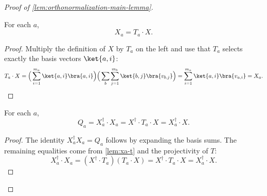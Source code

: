 \begin{proof}[Proof of \ref{lem:orthonormalization-main-lemma}]
	\begin{lemma}\label{lem:xa-t}
		\leanok
		For each $a$,
		\[
			X_a = T_a \cdot X.
		\]
	\end{lemma}
	\begin{proof}
		\leanok
		Multiply the definition of $X$ by $T_a$ on the left and use that $T_a$ selects exactly the basis vectors $\ket{a,i}$:
		\[
			T_a \cdot X
			=
			\Big(\sum_{i=1}^{m_a} \ket{a,i}\bra{a,i}\Big)
			\Big(\sum_b \sum_{j=1}^{m_b} \ket{b,j}\bra{v_{b,j}}\Big)
			=
			\sum_{i=1}^{m_a} \ket{a,i}\bra{v_{a,i}}
			=
			X_a.
		\]
	\end{proof}

	\begin{lemma}[$Q_a$ restated]\label{lem:qa-restated}
		\leanok
		For each $a$,
		\begin{equation*}
			Q_a = X_a^\dagger \cdot X_a = X^\dagger \cdot T_a \cdot X = X_a^\dagger \cdot X.
		\end{equation*}
	\end{lemma}
	\begin{proof}
		\leanok
		The identity $X_a^\dagger X_a = Q_a$ follows by expanding the basis sums. The remaining equalities come from \ref{lem:xa-t} and the projectivity of $T$:
		\[
			X_a^\dagger \cdot X_a
			=
			(X^\dagger \cdot T_a)(T_a \cdot X)
			=
			X^\dagger \cdot T_a \cdot X
			=
			X_a^\dagger \cdot X.
		\]
	\end{proof}


\end{proof}
